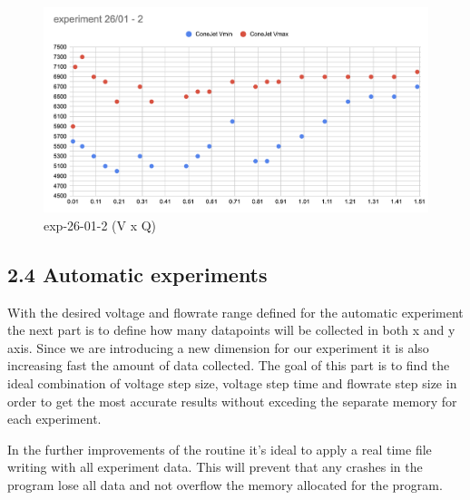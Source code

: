     \begin{figure}[H]
        \center
        \includegraphics[width=12cm]{Figuras/report3/exp26-01-2.png}
        \caption{ exp-26-01-2 (V x Q)}
    \end{figure}


\subsection*{2.4 Automatic experiments}

With the desired voltage and flowrate range defined for the automatic experiment the next part is to define how many datapoints will be collected in both
x and y axis. Since we are introducing a new dimension for our experiment it is also increasing fast the amount of data collected.
The goal of this part is to find the ideal combination of voltage step size, voltage step time and flowrate step size in order to get the most accurate results without exceding the separate memory for each experiment.

In the further improvements of the routine it's ideal to apply a real time file writing with all experiment data.
This will prevent that any crashes in the program lose all data and not overflow the memory allocated for the program.


